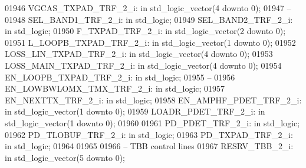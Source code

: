 \begin{DoxyCode}
01946     VGCAS\_TXPAD\_TRF\_2\_i:    \textcolor{keywordflow}{in} \textcolor{comment}{std\_logic\_vector}(\textcolor{vhdllogic}{}\textcolor{vhdllogic}{4} \textcolor{keywordflow}{downto} \textcolor{vhdllogic}{}\textcolor{vhdllogic}{0});
01947 \textcolor{keyword}{    --}
01948     SEL\_BAND1\_TRF\_2\_i:  \textcolor{keywordflow}{in} \textcolor{comment}{std\_logic};
01949     SEL\_BAND2\_TRF\_2\_i:  \textcolor{keywordflow}{in} \textcolor{comment}{std\_logic};
01950     F\_TXPAD\_TRF\_2\_i:    \textcolor{keywordflow}{in} \textcolor{comment}{std\_logic\_vector}(\textcolor{vhdllogic}{}\textcolor{vhdllogic}{2} \textcolor{keywordflow}{downto} \textcolor{vhdllogic}{}\textcolor{vhdllogic}{0});
01951     L\_LOOPB\_TXPAD\_TRF\_2\_i:  \textcolor{keywordflow}{in} \textcolor{comment}{std\_logic\_vector}(\textcolor{vhdllogic}{}\textcolor{vhdllogic}{1} \textcolor{keywordflow}{downto} \textcolor{vhdllogic}{}\textcolor{vhdllogic}{0});
01952     LOSS\_LIN\_TXPAD\_TRF\_2\_i: \textcolor{keywordflow}{in} \textcolor{comment}{std\_logic\_vector}(\textcolor{vhdllogic}{}\textcolor{vhdllogic}{4} \textcolor{keywordflow}{downto} \textcolor{vhdllogic}{}\textcolor{vhdllogic}{0});
01953     LOSS\_MAIN\_TXPAD\_TRF\_2\_i:    \textcolor{keywordflow}{in} \textcolor{comment}{std\_logic\_vector}(\textcolor{vhdllogic}{}\textcolor{vhdllogic}{4} \textcolor{keywordflow}{downto} \textcolor{vhdllogic}{}\textcolor{vhdllogic}{0});
01954     EN\_LOOPB\_TXPAD\_TRF\_2\_i: \textcolor{keywordflow}{in} \textcolor{comment}{std\_logic};
01955 \textcolor{keyword}{    --}
01956     EN\_LOWBWLOMX\_TMX\_TRF\_2\_i:   \textcolor{keywordflow}{in} \textcolor{comment}{std\_logic};
01957     EN\_NEXTTX\_TRF\_2\_i:  \textcolor{keywordflow}{in} \textcolor{comment}{std\_logic};
01958     EN\_AMPHF\_PDET\_TRF\_2\_i:  \textcolor{keywordflow}{in} \textcolor{comment}{std\_logic\_vector}(\textcolor{vhdllogic}{}\textcolor{vhdllogic}{1} \textcolor{keywordflow}{downto} \textcolor{vhdllogic}{}\textcolor{vhdllogic}{0});
01959     LOADR\_PDET\_TRF\_2\_i: \textcolor{keywordflow}{in} \textcolor{comment}{std\_logic\_vector}(\textcolor{vhdllogic}{}\textcolor{vhdllogic}{1} \textcolor{keywordflow}{downto} \textcolor{vhdllogic}{}\textcolor{vhdllogic}{0});
01960 
01961     PD\_PDET\_TRF\_2\_i:    \textcolor{keywordflow}{in} \textcolor{comment}{std\_logic};
01962     PD\_TLOBUF\_TRF\_2\_i:  \textcolor{keywordflow}{in} \textcolor{comment}{std\_logic};
01963     PD\_TXPAD\_TRF\_2\_i:   \textcolor{keywordflow}{in} \textcolor{comment}{std\_logic};
01964 
01965 
01966 \textcolor{keyword}{    -- TBB control lines}
01967     RESRV\_TBB\_2\_i:  \textcolor{keywordflow}{in} \textcolor{comment}{std\_logic\_vector}(\textcolor{vhdllogic}{}\textcolor{vhdllogic}{5} \textcolor{keywordflow}{downto} \textcolor{vhdllogic}{}\textcolor{vhdllogic}{0});

\end{DoxyCode}

